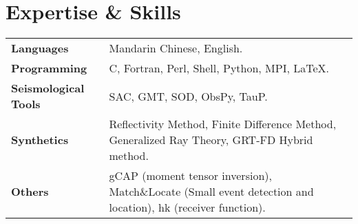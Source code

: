 \section*{Expertise \& Skills}

\begin{tabular}{p{} p{}}
\textbf{Languages} & Mandarin Chinese, English. \\
\textbf{Programming} & C, Fortran, Perl, Shell, Python, MPI, LaTeX. \\
\textbf{Seismological Tools} & SAC, GMT, SOD, ObsPy, TauP. \\
\textbf{Synthetics} & Reflectivity Method, Finite Difference Method, Generalized Ray Theory, GRT-FD Hybrid method.\\
\textbf{Others} & gCAP (moment tensor inversion), Match\&Locate (Small event detection and location), hk (receiver function). \\
\end{tabular}
